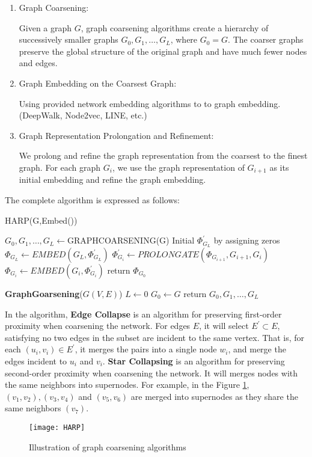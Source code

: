 \documentclass[conference]{IEEEtran}
\begin{document}
\begin{enumerate}
	\item Graph Coarsening:
	
	Given a graph $G$, graph coarsening algorithms create a hierarchy of successively smaller graphs $G_0,G_1,\ldots,G_L$, where $G_0=G$. The coarser graphs preserve the global structure of the original graph and have much fewer nodes and edges.
	\item Graph Embedding on the Coarsest Graph:
	
	Using provided network embedding algorithms to to graph embedding.(DeepWalk, Node2vec, LINE, etc.)
	\item Graph Representation Prolongation and Refinement:
	
	We prolong and refine the graph representation from the coarsest to the finest graph. For each graph $G_i$, we use the graph representation of $G_{i+1}$ as its initial embedding and refine the graph embedding.
\end{enumerate}
The complete algorithm is expressed as follows:
\begin{algorithm}[h]
  \caption{HARP(G,Embed())}  
  $G_0,G_1,\ldots,G_L\leftarrow$GRAPHCOARSENING(G)\;  
  Initial $\Phi_{G_L}^{'}$ by assigning zeros\;
  $\Phi_{G_L}\leftarrow EMBED(G_L,\Phi_{G_L}^{'})$
  {$\Phi_{G_i}^{'}\leftarrow PROLONGATE(\Phi_{G_{i+1}},G_{i+1},G_i)$\;
  $\Phi_{G_i}\leftarrow EMBED(G_i,\Phi_{G_i}^{'})$
  }
  return $\Phi_{G_0}$\;
  
  \textbf{GraphGoarsening}($G(V,E)$)
  $L\leftarrow 0$\;
  $G_0\leftarrow G$\;
  return $G_0,G_1,\ldots,G_L$\;
\end{algorithm}  
In the algorithm, \textbf{Edge Collapse} is an algorithm for preserving first-order proximity when coarsening the network. For edges $E$, it will select $E^{'}\subset E$, satisfying no two edges in the subset are incident to the same vertex. That is, for each $(u_i,v_i)\in E^{'}$, it merges the pairs into a single node $w_i$, and merge the edges incident to $u_i$ and $v_i$. \textbf{Star Collapsing} is an algorithm for preserving second-order proximity when coarsening the network. It will merges nodes with the same neighbors into supernodes. For example, in the Figure \ref{fig_HARP},$(v_1,v_2),(v_3,v_4)$ and $(v_5,v_6)$ are merged into supernodes as they share the same neighbors $(v_7)$.
\begin{figure}[h]
\centering
\texttt{[image: HARP]}
\caption{Illustration of graph coarsening algorithms}
\label{fig_HARP}
\end{figure}
\end{document}

